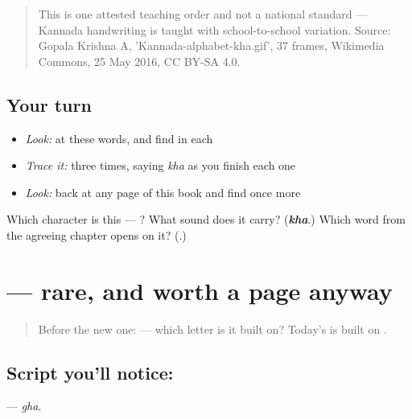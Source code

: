 \begin{quote}
This is one attested teaching order and not a national standard — Kannada handwriting is taught with school-to-school variation. Source: Gopala Krishna A, 'Kannada-alphabet-kha.gif', 37 frames, Wikimedia Commons, 25 May 2016, CC BY-SA 4.0.
\end{quote}

\subsection*{Your turn}
\begin{itemize}
\raggedright
  \item \emph{Look:} at these words, and find  in each
\end{itemize}

\begin{quote}
\end{quote}

\begin{itemize}
\raggedright
  \item \emph{Trace it:}  three times, saying \emph{kha} as you finish each one
  \item \emph{Look:} back at any page of this book and find  once more
\end{itemize}

\begin{tcolorbox}[breakable,colback=teal!4,colframe=teal!35!black,title={Before you move on}]
Which character is this — ? What sound does it carry? (\emph{\textbf{kha}}.) Which word from the agreeing chapter opens on it? (\textbf{}.)
\end{tcolorbox}
\section[\texorpdfstring{\kn{ಘ} (gha)}{ಘ (gha)}]{ — rare, and worth a page anyway}

\label{lesson:KA-S171-letter-gha}



\begin{quote}
Before the new one:  — which letter is it built on? Today's is built on .
\end{quote}

\subsection*{Script you'll notice: }
\textbf{} — \emph{gha}.

